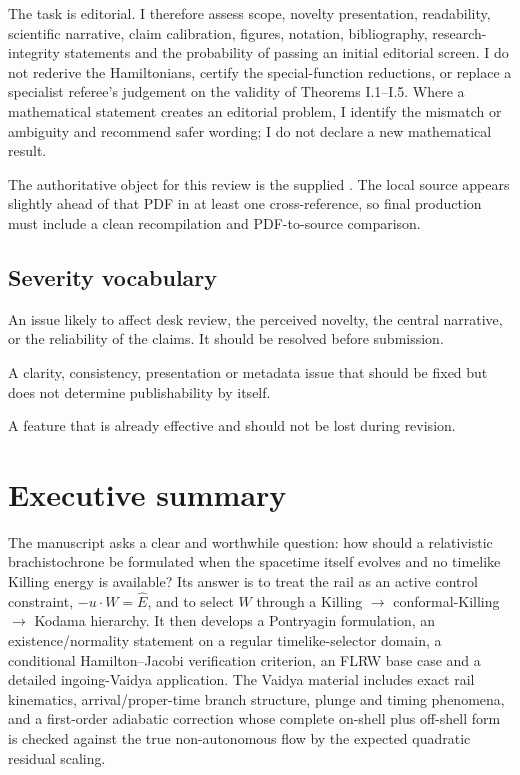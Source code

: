 \documentclass[11pt,a4paper]{article}
\newcommand{\major}{\textcolor{DarkRed}{\textbf{Major}}}
\newcommand{\minor}{\textcolor{CQGblue}{\textbf{Minor}}}
\newcommand{\preserve}{\textcolor{DarkGreen}{\textbf{Preserve}}}
\begin{document}
The task is editorial.  I therefore assess scope, novelty presentation, readability,
scientific narrative, claim calibration, figures, notation, bibliography, research-integrity
statements and the probability of passing an initial editorial screen.  I do not rederive the
Hamiltonians, certify the special-function reductions, or replace a specialist referee's
judgement on the validity of Theorems I.1--I.5.  Where a mathematical statement creates an
editorial problem, I identify the mismatch or ambiguity and recommend safer wording; I do not
declare a new mathematical result.

The authoritative object for this review is the supplied .  The local
 source appears slightly ahead of that PDF in at least one
cross-reference, so final production must include a clean recompilation and PDF-to-source
comparison.

\subsection*{Severity vocabulary}

\begin{description}[leftmargin=1.8cm,style=nextline]
  \item[\major] An issue likely to affect desk review, the perceived novelty, the central
  narrative, or the reliability of the claims.  It should be resolved before submission.
  \item[\minor] A clarity, consistency, presentation or metadata issue that should be fixed but
  does not determine publishability by itself.
  \item[\preserve] A feature that is already effective and should not be lost during revision.
\end{description}

\section{Executive summary}

The manuscript asks a clear and worthwhile question: how should a relativistic
brachistochrone be formulated when the spacetime itself evolves and no timelike Killing energy
is available?  Its answer is to treat the rail as an active control constraint,
$-u\!\cdot\!W=\hat E$, and to select $W$ through a Killing $\rightarrow$
conformal-Killing $\rightarrow$ Kodama hierarchy.  It then develops a Pontryagin formulation,
an existence/normality statement on a regular timelike-selector domain, a conditional
Hamilton--Jacobi verification criterion, an FLRW base case and a detailed ingoing-Vaidya
application.  The Vaidya material includes exact rail kinematics, arrival/proper-time branch
structure, plunge and timing phenomena, and a first-order adiabatic correction whose complete
on-shell plus off-shell form is checked against the true non-autonomous flow by the expected
quadratic residual scaling.
\end{document}
